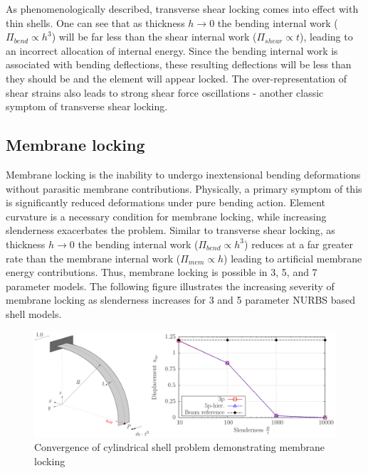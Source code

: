 As phenomenologically described, transverse shear locking comes into effect with thin shells. One can see that as thickness $h \rightarrow 0$ the bending internal work ($\Pi_{bend} \propto h^3$) will be far less than the shear internal work ($\Pi_{shear} \propto t$), leading to an incorrect allocation of internal energy. Since the bending internal work is associated with bending deflections, these resulting deflections will be less than they should be and the element will appear locked. The over-representation of shear strains also leads to strong shear force oscillations - another classic symptom of transverse shear locking.

\subsection{Membrane locking}
\label{membrane_locking_theory}

Membrane locking is the inability to undergo inextensional bending deformations without parasitic membrane contributions. Physically, a primary symptom of this is significantly reduced deformations under pure bending action. Element curvature is a necessary condition for membrane locking, while increasing slenderness exacerbates the problem. Similar to transverse shear locking, as thickness $h \rightarrow 0$ the bending internal work ($\Pi_{bend} \propto h^3$) reduces at a far greater rate than the membrane internal work ($\Pi_{mem} \propto h$) leading to artificial membrane energy contributions. Thus, membrane locking is possible in 3, 5, and 7 parameter models. The following figure illustrates the increasing severity of membrane locking as slenderness increases for 3 and 5 parameter NURBS based shell models.

\begin{figure}[H]
	\centering
	\def\svgwidth{\columnwidth}
	\includegraphics[width=14cm]{images/membranelocking.png}
	\caption{Convergence of cylindrical shell problem demonstrating membrane locking \cite{Echter13}}
	\label{ansexample}
\end{figure}

